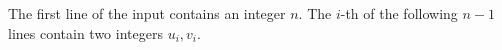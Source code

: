 The first line of the input contains an integer $n$.
The $i$-th of the following $n-1$ lines contain two integers $u_i,v_i$.
